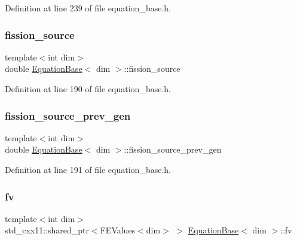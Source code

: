 Definition at line 239 of file equation\+\_\+base.\+h.

\mbox{\label{class_equation_base_aec6881c5aa66a28deab370236219f569}} 
\subsubsection{\texorpdfstring{fission\+\_\+source}{fission\_source}}
{\footnotesize\ttfamily template$<$int dim$>$ \\
double \hyperlink{class_equation_base}{Equation\+Base}$<$ dim $>$\+::fission\+\_\+source\hspace{0.3cm}{\ttfamily [protected]}}



Definition at line 190 of file equation\+\_\+base.\+h.

\mbox{\label{class_equation_base_aac7587c6cd96b508a52f1ed4782b4806}} 
\subsubsection{\texorpdfstring{fission\+\_\+source\+\_\+prev\+\_\+gen}{fission\_source\_prev\_gen}}
{\footnotesize\ttfamily template$<$int dim$>$ \\
double \hyperlink{class_equation_base}{Equation\+Base}$<$ dim $>$\+::fission\+\_\+source\+\_\+prev\+\_\+gen\hspace{0.3cm}{\ttfamily [protected]}}



Definition at line 191 of file equation\+\_\+base.\+h.

\mbox{\label{class_equation_base_abf3c19880eaea0911fff9eb7f3b4b425}} 
\subsubsection{\texorpdfstring{fv}{fv}}
{\footnotesize\ttfamily template$<$int dim$>$ \\
std\+\_\+cxx11\+::shared\+\_\+ptr$<$F\+E\+Values$<$dim$>$ $>$ \hyperlink{class_equation_base}{Equation\+Base}$<$ dim $>$\+::fv\hspace{0.3cm}{\ttfamily [protected]}}



